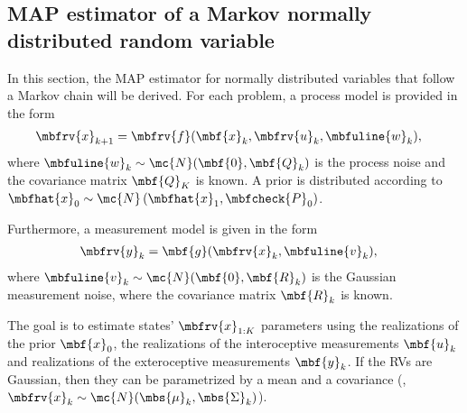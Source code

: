 \subsection{MAP estimator of a Markov normally distributed random variable}

In this section, the MAP estimator for normally distributed variables that follow a Markov chain will be derived. For each problem, a process model is provided in the form 
\begin{align}
    \label{eq:MAP state estimation process model}
    \mbfrv{x}_{k+1} &= \mbfrv{f}(\mbf{x}_{k}, \mbfrv{u}_{k}, \mbfuline{w}_{k}),
\end{align}
where $\mbfuline{w}_{k}\sim\mc{N}(\mbf{0},\mbf{Q}_{k})$ is the process noise and the covariance matrix $\mbf{Q}_{K}$ is known. A prior is distributed according to $\mbfhat{x}_{0}\sim\mc{N}\left( \mbfhat{x}_{1}, \mbfcheck{P}_{0} \right)$.

Furthermore, a measurement model is given in the form
\begin{align}
    \label{eq:MAP state estimation measurement model}
    \mbfrv{y}_{k} &= \mbf{g}(\mbfrv{x}_{k}, \mbfuline{v}_{k}),
\end{align}
where $\mbfuline{v}_{k}\sim\mc{N}(\mbf{0},\mbf{R}_{k})$ is the Gaussian measurement noise, where the covariance matrix $\mbf{R}_{k}$ is known. 

The goal is to estimate states' $\mbfrv{x}_{1:K}$ parameters using the realizations of the prior $\mbf{x}_{0}$, the realizations of the interoceptive measurements $\mbf{u}_{k}$ and realizations of the exteroceptive measurements $\mbf{y}_{k}$. If the RVs are Gaussian, then they can be parametrized by a mean and a covariance (\ie, $\mbfrv{x}_{k}\sim\mc{N}(\mbs{\mu}_{k}, \mbs{\Sigma}_{k})$). 


